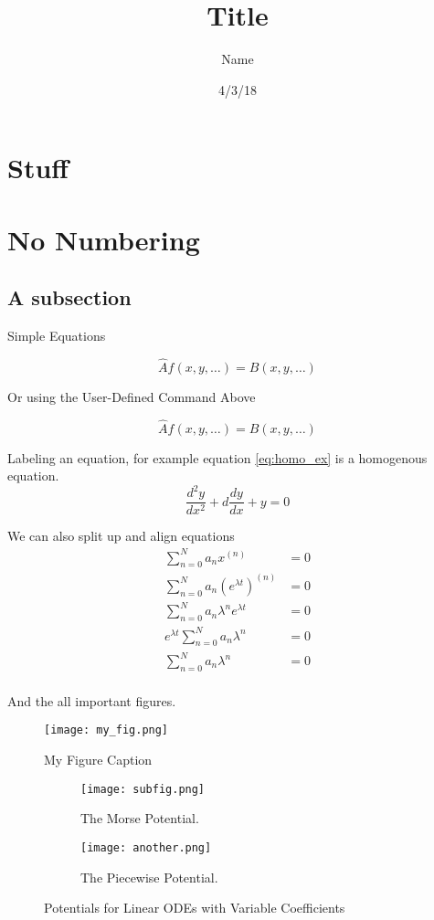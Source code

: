 \documentclass{article}
\title{Title}
\date{4/3/18}
\author{Name}
\newcommand{\be}{\begin{equation}}
\newcommand{\ee}{\end{equation}}
\begin{document}
\maketitle

\section{Stuff}

\section*{No Numbering}

\subsection{A subsection}
Simple Equations

\begin{equation}
\hat{A} f(x,y,\hdots) = B(x,y,\hdots)
\end{equation}

Or using the User-Defined Command Above

\be
\hat{A} f(x,y,\hdots) = B(x,y,\hdots)
\ee

Labeling an equation, for example equation \ref{eq:homo_ex} is a homogenous equation. 
\be \label{eq:homo_ex}
\frac{d^2y}{dx^2} + d\frac{dy}{dx} + y = 0
\ee

We can also split up and align equations
\be
\begin{split}
    \sum_{n=0}^N a_nx^{(n)} &= 0\\
    \sum_{n=0}^N a_n \left(e^{\lambda t}\right) ^{(n)} &= 0\\
    \sum_{n=0}^N a_n \lambda^n e^{\lambda t} &= 0\\
    e^{\lambda t} \sum_{n=0}^N a_n \lambda^n &= 0\\
    \sum_{n=0}^N a_n \lambda^n &= 0\\
\end{split}
\ee

And the all important figures. 
\begin{figure}[h]
  \centering
  \texttt{[image: my\_fig.png]}
    \caption{My Figure Caption}
  \label{fig:under_damped}
\end{figure}

\begin{figure}[H]
    \centering
    \begin{subfigure}[b]{0.49\textwidth}
        \texttt{[image: subfig.png]}
  	\caption{The Morse Potential.} 
    \end{subfigure}
    \begin{subfigure}[b]{0.49\textwidth}
        \texttt{[image: another.png]}
        \caption{The Piecewise Potential.}
    \end{subfigure}
    \caption{Potentials for Linear ODEs with Variable Coefficients}
\end{figure}
\end{document}
